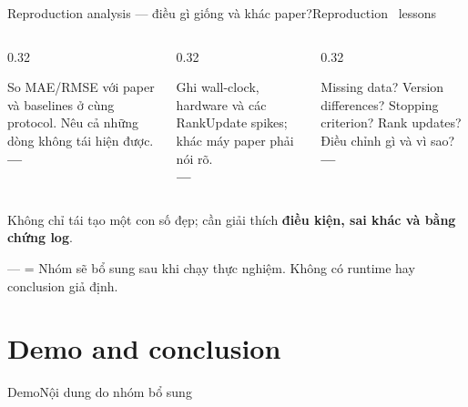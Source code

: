 \documentclass[aspectratio=169,11pt]{beamer}
\begin{document}
\begin{frame}[shrink=35]{Reproduction analysis --- điều gì giống và khác paper?}{Reproduction \textperiodcentered\ lessons}
\begin{columns}[T,onlytextwidth]
\begin{column}{0.32\textwidth}
\begin{intuition}[Accuracy]
  So MAE/RMSE với paper và baselines ở cùng protocol. Nêu cả những dòng không tái hiện được.\\[3mm]
  \textbf{---}
\end{intuition}
\end{column}
\begin{column}{0.32\textwidth}
\begin{mathcard}
  Ghi wall-clock, hardware và các RankUpdate spikes; khác máy paper phải nói rõ.\\[3mm]
  \textbf{---}
\end{mathcard}
\end{column}
\begin{column}{0.32\textwidth}
\begin{questioncard}
  \par
  Missing data? Version differences? Stopping criterion? Rank updates? Điều chỉnh gì và vì sao?\\[3mm]
  \textbf{---}
\end{questioncard}
\end{column}
\end{columns}
\vspace{5mm}
\begin{takeaway}
  Không chỉ tái tạo một con số đẹp; cần giải thích \textbf{điều kiện, sai khác và bằng chứng log}.
\end{takeaway}
\vspace{4mm}
\centering
{\color{DTMuted}--- = Nhóm sẽ bổ sung sau khi chạy thực nghiệm. Không có runtime hay conclusion giả định.}
\end{frame}

\section{Demo and conclusion}

\begin{frame}{Demo}{Nội dung do nhóm bổ sung}
\end{frame}
\end{document}
